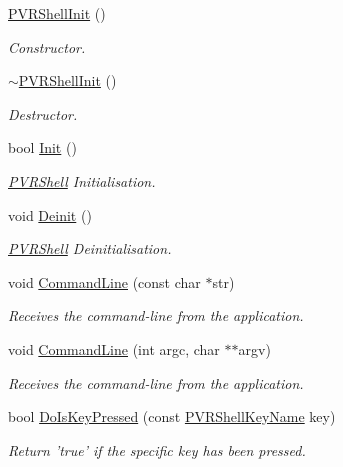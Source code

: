 \begin{DoxyCompactItemize}
\item 
\hyperlink{class_p_v_r_shell_init_ac4d91a54b5be50ec82ac4b332ec78269}{P\+V\+R\+Shell\+Init} ()
\begin{DoxyCompactList}\small\item\em Constructor. \end{DoxyCompactList}\item 
\hyperlink{class_p_v_r_shell_init_a26db46183d5a22b5b21295798dee43fc}{$\sim$\+P\+V\+R\+Shell\+Init} ()
\begin{DoxyCompactList}\small\item\em Destructor. \end{DoxyCompactList}\item 
bool \hyperlink{class_p_v_r_shell_init_a3dd0557eba17aca896b894a353561893}{Init} ()
\begin{DoxyCompactList}\small\item\em \hyperlink{class_p_v_r_shell}{P\+V\+R\+Shell} Initialisation. \end{DoxyCompactList}\item 
void \hyperlink{class_p_v_r_shell_init_a283a4536e480787a14167b34ec8a42b0}{Deinit} ()
\begin{DoxyCompactList}\small\item\em \hyperlink{class_p_v_r_shell}{P\+V\+R\+Shell} Deinitialisation. \end{DoxyCompactList}\item 
void \hyperlink{class_p_v_r_shell_init_aa40acedd6898409a7d66996407bc5e00}{Command\+Line} (const char $\ast$str)
\begin{DoxyCompactList}\small\item\em Receives the command-\/line from the application. \end{DoxyCompactList}\item 
void \hyperlink{class_p_v_r_shell_init_a146f3dbb515ad6a2ec6bec3e2f6c8da8}{Command\+Line} (int argc, char $\ast$$\ast$argv)
\begin{DoxyCompactList}\small\item\em Receives the command-\/line from the application. \end{DoxyCompactList}\item 
bool \hyperlink{class_p_v_r_shell_init_abcc27a82733ec6809b60db9d4da298cb}{Do\+Is\+Key\+Pressed} (const \hyperlink{_p_v_r_shell_8h_afe6e702981239131fb8bb06574e35159}{P\+V\+R\+Shell\+Key\+Name} key)
\begin{DoxyCompactList}\small\item\em Return 'true' if the specific key has been pressed. \end{DoxyCompactList}\item 
$$
\end{DoxyCompactItemize}
